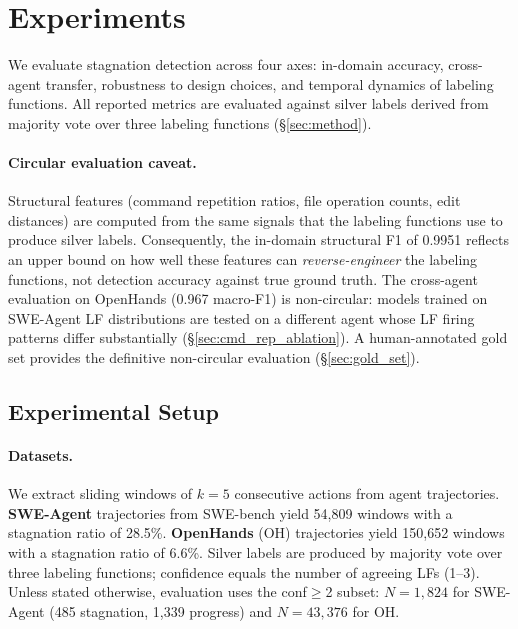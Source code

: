 \section{Experiments}
\label{sec:experiments}

We evaluate stagnation detection across four axes: in-domain accuracy, cross-agent transfer, robustness to design choices, and temporal dynamics of labeling functions.
All reported metrics are evaluated against silver labels derived from majority vote over three labeling functions (\S\ref{sec:method}).

\paragraph{Circular evaluation caveat.}
Structural features (command repetition ratios, file operation counts, edit distances) are computed from the same signals that the labeling functions use to produce silver labels.
Consequently, the in-domain structural F1 of 0.9951 reflects an upper bound on how well these features can \emph{reverse-engineer} the labeling functions, not detection accuracy against true ground truth.
The cross-agent evaluation on OpenHands (0.967 macro-F1) is non-circular: models trained on SWE-Agent LF distributions are tested on a different agent whose LF firing patterns differ substantially (\S\ref{sec:cmd_rep_ablation}).
A human-annotated gold set provides the definitive non-circular evaluation (\S\ref{sec:gold_set}).

\subsection{Experimental Setup}
\label{sec:setup}

\paragraph{Datasets.}
We extract sliding windows of $k{=}5$ consecutive actions from agent trajectories.
\textbf{SWE-Agent} trajectories from SWE-bench \citep{jimenez2024swebench,yang2024sweagent} yield 54,809 windows with a stagnation ratio of 28.5\%.
\textbf{OpenHands} (OH) trajectories \citep{wang2025openhands} yield 150,652 windows with a stagnation ratio of 6.6\%.
Silver labels are produced by majority vote over three labeling functions; confidence equals the number of agreeing LFs (1--3).
Unless stated otherwise, evaluation uses the conf${\geq}$2 subset: $N{=}1{,}824$ for SWE-Agent (485 stagnation, 1,339 progress) and $N{=}43{,}376$ for OH.

